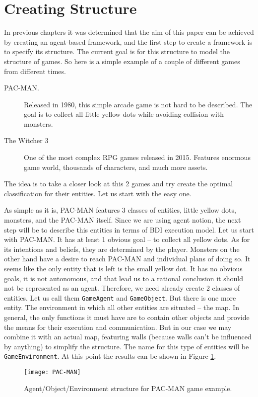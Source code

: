 \section{Creating Structure}
In previous chapters it was determined that the aim of this paper can be achieved by creating an agent-based framework, and the first step to create a framework is to specify its structure. The current goal is for this structure to model the structure of games. So here is a simple example of a couple of different games from different times.
\begin{description}
\item[PAC-MAN.]Released in 1980, this simple arcade game is not hard to be described.
The goal is to collect all little yellow dots while avoiding collision with monsters.
\item[The Witcher 3]One of the most complex RPG games released in 2015. Features enormous game world, thousands of characters, and much more assets.
\end{description}
The idea is to take a closer look at this 2 games and try create the optimal classification for their entities. Let us start with the easy one.\par
As simple as it is, PAC-MAN features 3 classes of entities, little yellow dots, monsters, and the PAC-MAN itself. Since we are using agent notion, the next step will be to describe this entities in terms of BDI execution model. Let us start with PAC-MAN. It has at least 1 obvious goal -- to collect all yellow dots. As for its intentions and beliefs, they are determined by the player. Monsters on the other hand have a desire to reach PAC-MAN and individual plans of doing so. It seems like the only entity that is left is the small yellow dot. It has no obvious goals, it is not autonomous, and that lead us to a rational conclusion it should not be represented as an agent. Therefore, we need already create 2 classes of entities. Let us call them \texttt{GameAgent} and \texttt{GameObject}. But there is one more entity. The environment in which all other entities are situated -- the map. In general, the only functions it must have are to contain other objects and provide the means for their execution and communication. But in our case we may combine it with an actual map, featuring walls (because walls can't be influenced by anything) to simplify the structure. The name for this type of entities will be \texttt{GameEnvironment}. At this point the results can be shown in Figure \ref{PacMan}. \par
 \begin{figure}[h!]
    \begin{center}
      \texttt{[image: PAC-MAN]}
      \caption{Agent/Object/Environment structure for PAC-MAN game example.}
      \label{PacMan}
     \end{center}
    \end{figure}

